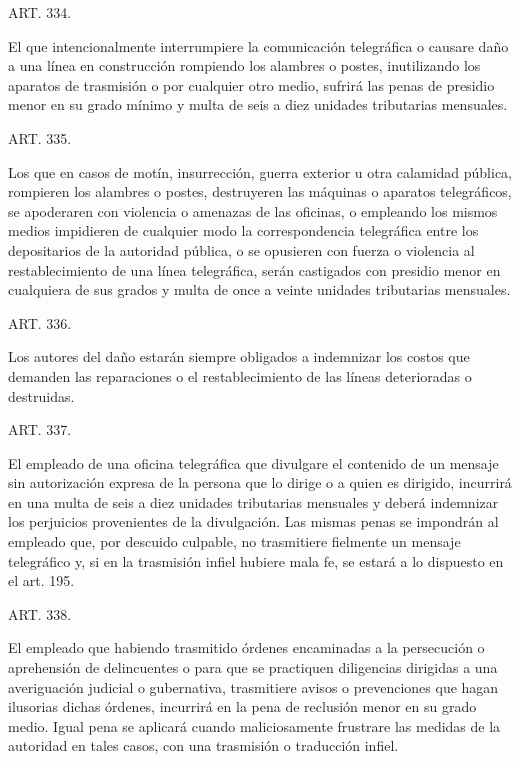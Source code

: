     ART. 334.

    El que intencionalmente interrumpiere la comunicación telegráfica o causare daño a una línea en construcción rompiendo los alambres o postes, inutilizando los aparatos de trasmisión o por cualquier otro medio, sufrirá las penas de presidio menor en su grado mínimo y multa de seis a diez unidades tributarias mensuales.








    ART. 335.

    Los que en casos de motín, insurrección, guerra exterior u otra calamidad pública, rompieren los alambres o postes, destruyeren las máquinas o aparatos telegráficos, se apoderaren con violencia o amenazas de las oficinas, o empleando los mismos medios impidieren de cualquier modo la correspondencia telegráfica entre los depositarios de la autoridad pública, o se opusieren con fuerza o violencia al restablecimiento de una línea telegráfica, serán castigados con presidio menor en cualquiera de sus grados y multa de once a veinte unidades tributarias mensuales.









    ART. 336.

    Los autores del daño estarán siempre obligados a indemnizar los costos que demanden las reparaciones o el restablecimiento de las líneas deterioradas o destruidas.



    ART. 337.

    El empleado de una oficina telegráfica que divulgare el contenido de un mensaje sin autorización expresa de la persona que lo dirige o a quien es dirigido, incurrirá en una multa de seis a diez unidades tributarias mensuales y deberá indemnizar los perjuicios provenientes de la divulgación.
    Las mismas penas se impondrán al empleado que, por descuido culpable, no trasmitiere fielmente un mensaje telegráfico y, si en la trasmisión infiel hubiere mala fe, se estará a lo dispuesto en el art. 195.






    ART. 338.

    El empleado que habiendo trasmitido órdenes encaminadas a la persecución o aprehensión de delincuentes o para que se practiquen diligencias dirigidas a una averiguación judicial o gubernativa, trasmitiere avisos o prevenciones que hagan ilusorias dichas órdenes, incurrirá en la pena de reclusión menor en su grado medio.
    Igual pena se aplicará cuando maliciosamente frustrare las medidas de la autoridad en tales casos, con una trasmisión o traducción infiel.



